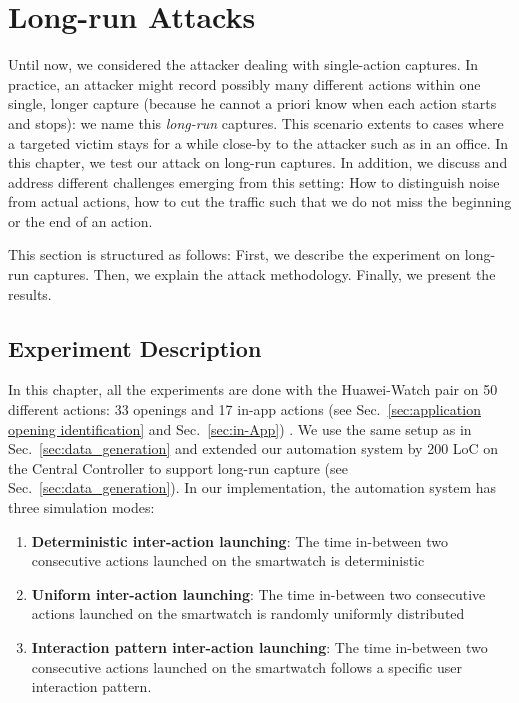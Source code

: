 \chapter{Long-run Attacks}
\label{chap:towards_a_realistic_attack}

Until now, we considered the attacker dealing with single-action captures. In practice, an attacker might record possibly many different actions within one single, longer capture (because he cannot a priori know when each action starts and stops): we name this \textit{long-run} captures. This scenario extents to cases where a targeted victim stays for a while close-by to the attacker such as in an office. In this chapter, we test our attack on long-run captures. In addition, we discuss and address different challenges emerging from this setting: How to distinguish noise from actual actions, how to cut the traffic such that we do not miss the beginning or the end of an action. 

This section is structured as follows: First, we describe the experiment on long-run captures. Then, we explain the attack methodology. Finally, we present the results.

\section{Experiment Description}
In this chapter, all the experiments are done with the Huawei-Watch pair on 50 different actions: 33 openings and 17 in-app actions (see Sec.~\ref{sec:application opening identification} and Sec.~\ref{sec:in-App}) . We use the same setup as in Sec.~\ref{sec:data_generation} and extended our automation system by 200 LoC on the Central Controller to support long-run capture (see Sec.~\ref{sec:data_generation}). In our implementation, the automation system has three simulation modes: 

\begin{enumerate}
    \item \textbf{Deterministic inter-action launching}: The time in-between two consecutive actions launched on the smartwatch is deterministic 
    \item \textbf{Uniform inter-action launching}: The time in-between two consecutive actions launched on the smartwatch is randomly uniformly distributed
    \item \textbf{Interaction pattern inter-action launching}: The time in-between two consecutive actions launched on the smartwatch follows a specific user interaction pattern.
\end{enumerate}

